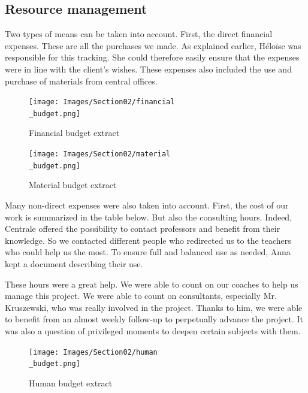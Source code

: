 \subsection{Resource management}
\label{ResMan}
Two types of means can be taken into account. First, the direct financial expenses. These are all the purchases we made. As explained earlier, Héloïse was responsible for this tracking. She could therefore easily ensure that the expenses were in line with the client's wishes. These expenses also included the use and purchase of materials from central offices. 

\begin{figure}[ht]
    \centering
    \texttt{[image: Images/Section02/financial\\\_budget.png]}
    \caption{Financial budget extract}
    \label{fig:financialBudgetextract}
\end{figure}
\FloatBarrier

\begin{figure}[ht]
    \centering
    \texttt{[image: Images/Section02/material\\\_budget.png]}
    \caption{Material budget extract}
    \label{fig:materialBudgetextract}
\end{figure}
\FloatBarrier
Many non-direct expenses were also taken into account. First, the cost of our work is summarized in the table below. But also the consulting hours. Indeed, Centrale offered the possibility to contact professors and benefit from their knowledge. So we contacted different people who redirected us to the teachers who could help us the most. To ensure full and balanced use as needed, Anna kept a document describing their use. 

\bigbreak
These hours were a great help. We were able to count on our coaches to help us manage this project. We were able to count on consultants, especially Mr. Kruszewski, who was really involved in the project. Thanks to him, we were able to benefit from an almost weekly follow-up to perpetually advance the project. It was also a question of privileged moments to deepen certain subjects with them.

\begin{figure}[ht]
    \centering
    \texttt{[image: Images/Section02/human\\\_budget.png]}
    \caption{Human budget extract}
    \label{fig:humanBudget}
\end{figure}